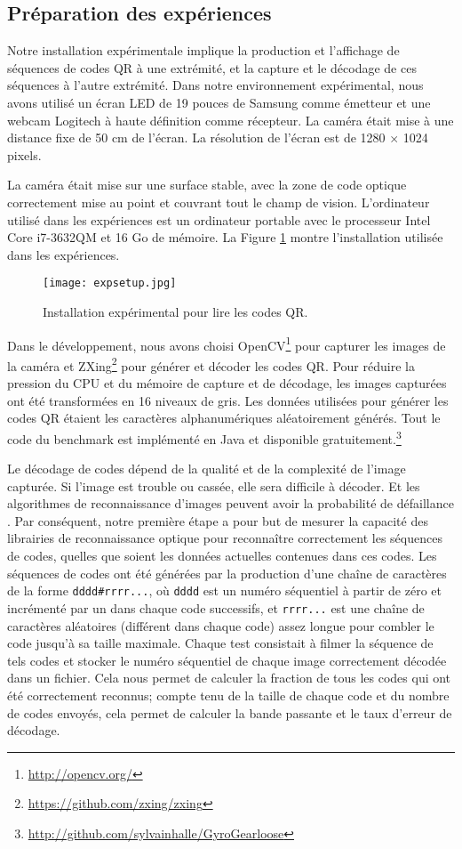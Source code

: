\subsection{Préparation des expériences}

Notre installation expérimentale implique la production et l'affichage de séquences de codes QR à une extrémité, et la capture et le décodage de ces séquences à l'autre extrémité. Dans notre environnement expérimental, nous avons utilisé un écran LED de 19 pouces de Samsung comme émetteur et une webcam Logitech à haute définition comme récepteur. La caméra était mise à une distance fixe de 50 cm de l'écran. La résolution de l'écran est de 1280 $\times$ 1024 pixels.

La caméra était mise sur une surface stable, avec la zone de code optique correctement mise au point et couvrant tout le champ de vision. L'ordinateur utilisé dans les expériences est un ordinateur portable avec le processeur Intel Core i7-3632QM et 16 Go de mémoire. La Figure \ref{fig:qr:setup} montre l'installation utilisée dans les expériences.

\begin{figure}
\centering
\texttt{[image: expsetup.jpg]}
\caption{Installation expérimental pour lire les codes QR.}
\label{fig:qr:setup}
\end{figure}

Dans le développement, nous avons choisi OpenCV\footnote{\url{http://opencv.org/}} pour capturer les images de la caméra et ZXing\footnote{\url{https://github.com/zxing/zxing}} pour générer et décoder les codes QR. Pour réduire la pression du CPU et du mémoire de capture et de décodage, les images capturées ont été transformées en 16 niveaux de gris. Les données utilisées pour générer les codes QR étaient les caractères alphanumériques aléatoirement générés. Tout le code du benchmark est implémenté en Java et disponible gratuitement.\footnote {\url{http://github.com/sylvainhalle/GyroGearloose}}

Le décodage de codes dépend de la qualité et de la complexité de l'image capturée. Si l'image est trouble ou cassée, elle sera difficile à décoder. Et les algorithmes de reconnaissance d'images peuvent avoir la probabilité de défaillance \citep{adel2006}. Par conséquent, notre première étape a pour but de mesurer la capacité des librairies de reconnaissance optique pour reconnaître correctement les séquences de codes, quelles que soient les données actuelles contenues dans ces codes. Les séquences de codes ont été générées par la production d'une chaîne de caractères de la forme \verb+dddd#rrrr...+, où \verb+dddd+ est un numéro séquentiel à partir de zéro et incrémenté par un dans chaque code successifs, et \verb+rrrr...+ est une chaîne de caractères aléatoires (différent dans chaque code) assez longue pour combler le code jusqu'à sa taille maximale. Chaque test consistait à filmer la séquence de tels codes et stocker le numéro séquentiel de chaque image correctement décodée dans un fichier. Cela nous permet de calculer la fraction de tous les codes qui ont été correctement reconnus; compte tenu de la taille de chaque code et du nombre de codes envoyés, cela permet de calculer la bande passante et le taux d'erreur de décodage.

